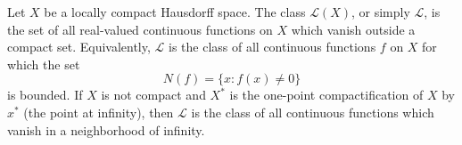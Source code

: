 Let $X$ be a locally compact Hausdorff space. The class $\mathcal{L}(X)$, or simply $\mathcal{L}$, is the set of all real-valued continuous functions on $X$ which vanish outside a compact set. Equivalently, $\mathcal{L}$ is the class of all continuous functions $f$ on $X$ for which the set
$$N(f) = \{x : f(x) \neq 0\}$$
is bounded. If $X$ is not compact and $X^*$ is the one-point compactification of $X$ by $x^*$ (the point at infinity), then $\mathcal{L}$ is the class of all continuous functions which vanish in a neighborhood of infinity.
